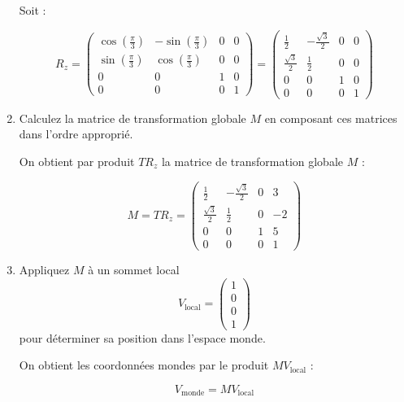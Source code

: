 \documentclass[a4paper,12pt]{article}
\begin{document}
\begin{enumerate}
    Soit :

\begin{equation}
    R_z = 
    \begin{pmatrix}
    \cos(\frac{\pi}{3}) & -\sin(\frac{\pi}{3}) & 0 & 0 \\
    \sin(\frac{\pi}{3}) & \cos(\frac{\pi}{3}) & 0 & 0 \\
    0 & 0 & 1 & 0 \\
    0 & 0 & 0 & 1
    \end{pmatrix} 
    =
    \begin{pmatrix}
    \frac{1}{2} & -\frac{\sqrt{3}}{2} & 0 & 0 \\
    \frac{\sqrt{3}}{2} & \frac{1}{2} & 0 & 0 \\
    0 & 0 & 1 & 0 \\
    0 & 0 & 0 & 1
    \end{pmatrix} \end{equation}


  \item Calculez la matrice de transformation globale \(M\) en composant ces matrices dans l'ordre approprié.

  On obtient par produit $T R_z$ la matrice de transformation globale \(M\) :

    \begin{equation}
    M = T R_z =
    \begin{pmatrix}
    \frac{1}{2} & -\frac{\sqrt{3}}{2} & 0 & 3 \\
    \frac{\sqrt{3}}{2} & \frac{1}{2} & 0 & -2 \\
    0 & 0 & 1 & 5 \\
    0 & 0 & 0 & 1
    \end{pmatrix} 
    \end{equation}


  \item Appliquez \(M\) à un sommet local 
  \[
  V_{\text{local}} = \begin{pmatrix} 1 \\ 0 \\ 0 \\ 1 \end{pmatrix}
  \]
  pour déterminer sa position dans l'espace monde.

  On obtient les coordonnées mondes par le produit $M V_{\text{local}}$ :

  \begin{equation}
  V_{\text{monde}} = M V_{\text{local}}
  \end{equation}


\end{enumerate}
\end{document}
